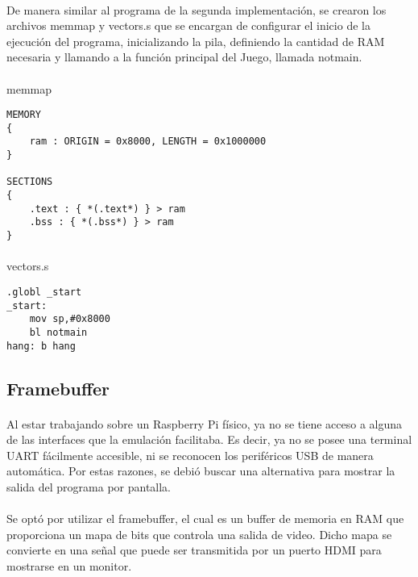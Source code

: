 \documentclass{article}
\begin{document}
\paragraph{}
De manera similar al programa de la segunda implementaci\'on, se crearon los archivos memmap y vectors.s que se encargan de configurar el inicio de la ejecuci\'on del programa, inicializando la pila, definiendo la cantidad de RAM necesaria y llamando a la funci\'on principal del Juego, llamada notmain.

\paragraph{}
memmap
\begin{lstlisting}
MEMORY
{
    ram : ORIGIN = 0x8000, LENGTH = 0x1000000
}

SECTIONS
{
    .text : { *(.text*) } > ram
    .bss : { *(.bss*) } > ram
}
\end{lstlisting}

\paragraph{}
vectors.s

\begin{lstlisting}
.globl _start
_start:
    mov sp,#0x8000
    bl notmain
hang: b hang
\end{lstlisting}


\subsection{Framebuffer}

\paragraph{}
Al estar trabajando sobre un Raspberry Pi f\'isico, ya no se tiene acceso a alguna de las interfaces que la emulaci\'on facilitaba. Es decir, ya no se posee una terminal UART f\'acilmente accesible, ni se reconocen los perif\'ericos USB de manera autom\'atica. Por estas razones, se debi\'o buscar una alternativa para mostrar la salida del programa por pantalla.

\paragraph{}
Se opt\'o por utilizar el framebuffer, el cual es un buffer de memoria en RAM que proporciona un mapa de bits que controla una salida de video. Dicho mapa se convierte en una se\~nal que puede ser transmitida por un puerto HDMI para mostrarse en un monitor.
\end{document}
